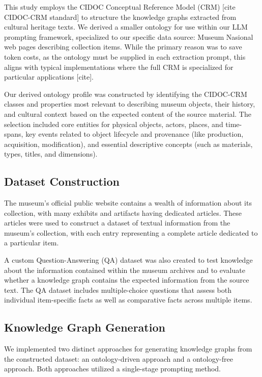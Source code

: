 \documentclass[a4, conference]{IEEEtran}
\begin{document}
This study employs the CIDOC Conceptual Reference Model (CRM) [cite CIDOC-CRM standard] to structure the knowledge graphs extracted from cultural heritage texts. We derived a smaller ontology for use within our LLM prompting framework, specialized to our specific data source: Museum Nasional web pages describing collection items. While the primary reason was to save token costs, as the ontology must be supplied in each extraction prompt, this aligns with typical implementations where the full CRM is specialized for particular applications [cite].

Our derived ontology profile was constructed by identifying the CIDOC-CRM classes and properties most relevant to describing museum objects, their history, and cultural context based on the expected content of the source material. The selection included core entities for physical objects, actors, places, and time-spans, key events related to object lifecycle and provenance (like production, acquisition, modification), and essential descriptive concepts (such as materials, types, titles, and dimensions).

\subsection{Dataset Construction}

The museum's official public website contains a wealth of information about its collection, with many exhibits and artifacts having dedicated articles. These articles were used to construct a dataset of textual information from the museum's collection, with each entry representing a complete article dedicated to a particular item.

A custom Question-Answering (QA) dataset was also created to test knowledge about the information contained within the museum archives and to evaluate whether a knowledge graph contains the expected information from the source text. The QA dataset includes multiple-choice questions that assess both individual item-specific facts as well as comparative facts across multiple items.

\subsection{Knowledge Graph Generation}

We implemented two distinct approaches for generating knowledge graphs from the constructed dataset: an ontology-driven approach and a ontology-free approach. Both approaches utilized a single-stage prompting method.
\end{document}
